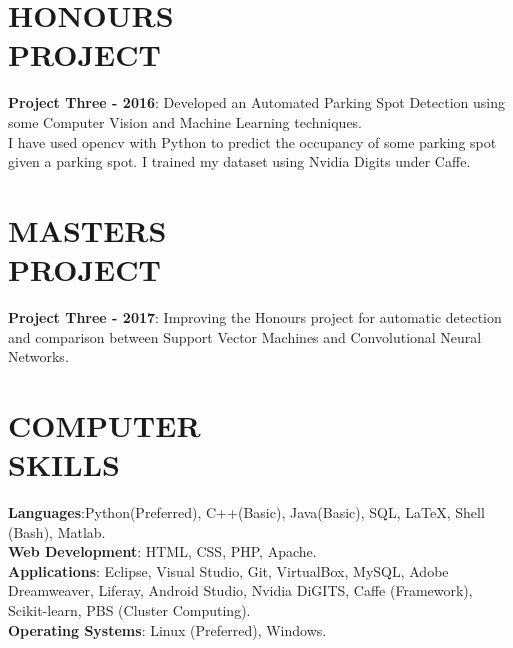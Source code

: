 \documentclass[margin]{res}
\begin{document}
\begin{resume}

\section{HONOURS\\PROJECT}
\par
\textbf{Project Three - 2016}:
Developed an Automated Parking Spot Detection using some Computer Vision and Machine Learning techniques.\\ I have used opencv with Python to predict the occupancy of some parking spot given a parking spot. I trained my dataset using Nvidia Digits under Caffe.  
\par

\section{MASTERS\\PROJECT}
\par
\textbf{Project Three - 2017}:
Improving the Honours project for automatic detection and comparison between Support Vector Machines and Convolutional Neural Networks. 
\par


\section{COMPUTER\\SKILLS}

\textbf{Languages}:Python(Preferred), C++(Basic), Java(Basic), SQL, \LaTeX, Shell (Bash), Matlab.
\\
\textbf{Web Development}: HTML, CSS, PHP, Apache.
\\
\textbf{Applications}: Eclipse, Visual Studio, Git, VirtualBox, 
MySQL, Adobe Dreamweaver, Liferay, Android Studio, Nvidia DiGITS, Caffe (Framework), Scikit-learn, PBS (Cluster Computing).
\\
\textbf{Operating Systems}: 
Linux (Preferred), Windows.

\vspace{0.5mm}


\end{resume}
\end{document}
